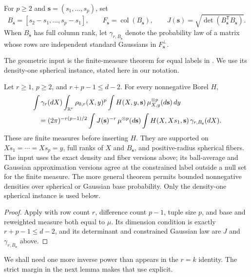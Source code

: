 For \(p\ge2\) and \(\mathbf s=(s_1,\ldots,s_p)\), set
\[
 B_{\mathbf s}=[s_2-s_1,\ldots,s_p-s_1],\qquad
 F_{\mathbf s}=\operatorname{col}(B_{\mathbf s}),\qquad
 J(\mathbf s)=\sqrt{\det(B_{\mathbf s}^{\mathsf T}B_{\mathbf s})}.
\]
When \(B_{\mathbf s}\) has full column rank, let
\(\gamma_{r,B_{\mathbf s}}\) denote the probability law of a matrix
whose rows are independent standard Gaussians in \(F_{\mathbf s}^\perp\).

The geometric input is the finite-measure theorem for equal labels
in \cite[Theorem~3.3]{OpenAIReplica2026}.  We use its density-one
spherical instance, stated here in our notation.
\begin{proposition}
\label{l:span:equal-label-assumption}
Let \(r\ge1\), \(p\ge2\), and \(r+p-1\le d-2\).  For every
nonnegative Borel \(H\),
\begin{align}
 &\int\gamma_r(dX)\int_{\mathbb R^r}\rho_{0,r}(X,y)^p
       \int H(X,y,\mathbf s)\,\mu_{X,y}^{\otimes p}(d\mathbf s)\,dy
       \notag\\
 &\quad=(2\pi)^{-r(p-1)/2}
       \int J(\mathbf s)^{-r}\,\mu^{\otimes p}(d\mathbf s)
       \int H(X,Xs_1,\mathbf s)\,\gamma_{r,B_{\mathbf s}}(dX).
 \label{l:span:equal-label-input}
\end{align}
These are finite measures before inserting \(H\).  They are supported
on \(Xs_1=\cdots=Xs_p=y\), full ranks of \(X\) and \(B_{\mathbf s}\),
and positive-radius spherical fibers.  The input uses the exact
density and fiber versions above; its ball-average and Gaussian
approximation versions agree at the constrained label outside a null
set for the finite measure.  The more general theorem permits bounded
nonnegative densities over spherical or Gaussian base probability.
Only the density-one spherical instance is used below.
\end{proposition}
\begin{proof}
Apply \cite[Theorem~3.3]{OpenAIReplica2026} with row count \(r\),
difference count \(p-1\), tuple size \(p\), and base and reweighted
measure both equal to \(\mu\).  Its dimension condition is exactly
\(r+p-1\le d-2\), and its determinant and constrained Gaussian
law are \(J\) and \(\gamma_{r,B_{\mathbf s}}\) above.
\end{proof}

We shall need one more inverse power than appears in the \(r=k\)
identity.  The strict margin in the next lemma makes that use explicit.

